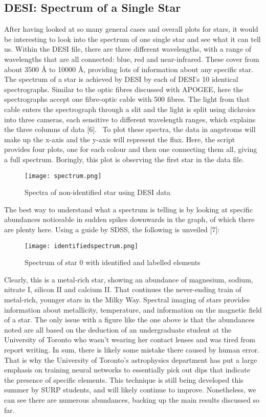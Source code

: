 \documentclass{article}
\begin{document}
\subsection*{DESI: Spectrum of a Single Star}
\indent After having looked at so many general cases and overall plots for stars, it would be interesting to look into the spectrum of one single star and see what it can tell us. Within the DESI file, there are three different wavelengths, with a range of wavelengths that are all connected: blue, red and near-infrared. These cover from about 3500 Å to 10000 Å, providing lots of information about any specific star. The spectrum of a star is achieved by DESI by each of DESI’s 10 identical spectrographs. Similar to the optic fibres discussed with APOGEE, here the spectrographs accept one fibre-optic cable with 500 fibres. The light from that cable enters the spectrograph through a slit and the light is split using dichroics into three cameras, each sensitive to different wavelength ranges, which explains the three columns of data [6].  To plot these spectra, the data in angstroms will make up the x-axis and the y-axis will represent the flux. Here, the script provides four plots, one for each colour and then one connecting them all, giving a full spectrum. Boringly, this plot is observing the first star in the data file.\\
\begin{figure}[H]
    \centering
    \texttt{[image: spectrum.png]}
    \caption{Spectra of non-identified star using DESI data}
    \label{fig:5}
\end{figure}
\indent The best way to understand what a spectrum is telling is by looking at specific abundances noticeable in sudden spikes downwards in the graph, of which there are plenty here. Using a guide by SDSS, the following is unveiled [7]:
\begin{figure}[H]
    \centering
    \texttt{[image: identifiedspectrum.png]}
    \caption{Spectrum of star 0 with identified and labelled elements}
    \label{fig:enter-label}
\end{figure}
\indent Clearly, this is a metal-rich star, showing an abundance of magnesium, sodium, nitrate I, silicon II and calcium II. That continues the never-ending train of metal-rich, younger stars in the Milky Way. Spectral imaging of stars provides information about metallicity, temperature, and information on the magnetic field of a star. The only issue with a figure like the one above is that the abundances noted are all based on the deduction of an undergraduate student at the University of Toronto who wasn’t wearing her contact lenses and was tired from report writing. In sum, there is likely some mistake there caused by human error. That is why the University of Toronto's astrophysics department has put a large emphasis on training neural networks to essentially pick out dips that indicate the presence of specific elements. This technique is still being developed this summer by SURP students, and will likely continue to improve. Nonetheless, we can see there are numerous abundances, backing up the main results discussed so far.\\
\end{document}
